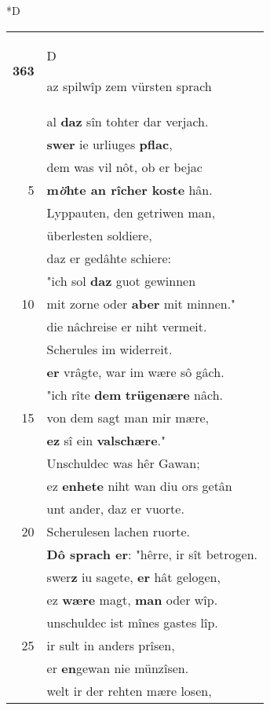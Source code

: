 \documentclass[8pt,a4paper,notitlepage]{article}
\begin{document}
\begin{table}[ht]
\begin{minipage}[t]{0.5\linewidth}
\small
\begin{center}*D
\end{center}
\begin{tabular}{rl}
\textbf{363} & \begin{large}D\end{large}az spilwîp zem vürsten sprach\\ 
 & al \textbf{daz} sîn tohter dar verjach.\\ 
 & \textbf{swer} ie urliuges \textbf{pflac},\\ 
 & dem was vil nôt, ob er bejac\\ 
5 & \textbf{m\textit{ö}hte an rîcher koste} hân.\\ 
 & Lyppauten, den getriwen man,\\ 
 & überlesten soldiere,\\ 
 & daz er gedâhte schiere:\\ 
 & "ich sol \textbf{daz} guot gewinnen\\ 
10 & mit zorne oder \textbf{aber} mit minnen."\\ 
 & die nâchreise er niht vermeit.\\ 
 & Scherules im widerreit.\\ 
 & \textbf{er} vrâgte, war im wære sô gâch.\\ 
 & "ich rîte \textbf{dem} \textbf{trügenære} nâch.\\ 
15 & von dem sagt man mir mære,\\ 
 & \textbf{ez} sî ein \textbf{valschære}."\\ 
 & Unschuldec was hêr Gawan;\\ 
 & ez \textbf{en}\textbf{hete} niht wan diu ors getân\\ 
 & unt ander, daz er vuorte.\\ 
20 & Scherulesen lachen ruorte.\\ 
 & \textbf{Dô sprach er}: "hêrre, ir sît betrogen.\\ 
 & swer\textbf{z} iu sagete, \textbf{er} hât gelogen,\\ 
 & ez \textbf{wære} magt, \textbf{man} oder wîp.\\ 
 & unschuldec ist mînes gastes lîp.\\ 
25 & ir sult in anders prîsen,\\ 
 & er \textbf{en}gewan nie münzîsen.\\ 
 & welt ir der rehten mære losen,\\ 

\end{tabular}
\end{minipage}
\end{table}
\end{document}
